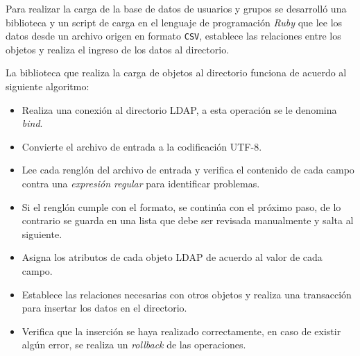 Para realizar la carga de la base de datos de usuarios y grupos se desarroll\'{o} una biblioteca y un script de carga en el lenguaje de programaci\'{o}n \textsl{Ruby} que lee los datos desde un archivo origen en formato \texttt{CSV}, establece las relaciones entre los objetos y realiza el ingreso de los datos al directorio.

La biblioteca que realiza la carga de objetos al directorio funciona de acuerdo al siguiente algoritmo:

\begin{itemize}
  \item Realiza una conexi\'{o}n al directorio LDAP, a esta operaci\'{o}n se le denomina \textit{bind}.
  \item Convierte el archivo de entrada a la codificaci\'{o}n \textsc{UTF-8}.
  \item Lee cada rengl\'{o}n del archivo de entrada y verifica el contenido de cada campo contra una \textit{expresi\'{o}n regular} para identificar problemas.
  \item Si el rengl\'{o}n cumple con el formato, se contin\'{u}a con el pr\'{o}ximo paso, de lo contrario se guarda en una lista que debe ser revisada manualmente y salta al siguiente.
  \item Asigna los atributos de cada objeto LDAP de acuerdo al valor de cada campo.
  \item Establece las relaciones necesarias con otros objetos y realiza una transacci\'{o}n para insertar los datos en el directorio.
  \item Verifica que la inserci\'{o}n se haya realizado correctamente, en caso de existir alg\'{u}n error, se realiza un \textit{rollback} de las operaciones.
\end{itemize}

